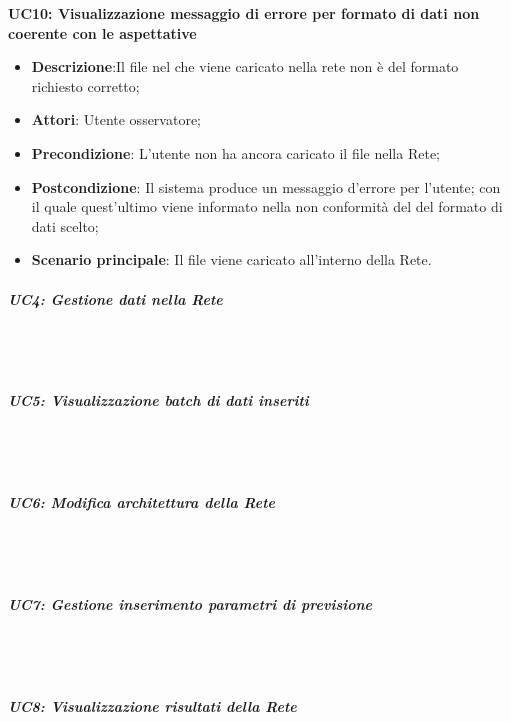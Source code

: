 \textbf{UC10: Visualizzazione messaggio di errore per formato di dati non coerente con le aspettative}\mbox{}
\label{UC10: Visualizzazione messaggio di errore per formato di dati non coerente con le aspettative}
\begin{itemize}
\item \textbf{Descrizione}:Il file nel che viene caricato nella rete non \`e del formato richiesto corretto;
\item \textbf{Attori}: Utente osservatore;
\item \textbf{Precondizione}: L'utente non ha ancora caricato il file nella Rete;
\item \textbf{Postcondizione}: Il sistema produce un messaggio d'errore per l'utente; con il quale quest'ultimo viene informato nella non conformit\`a del del formato di dati scelto;
\item \textbf{Scenario principale}: Il file viene caricato all'interno della Rete.
\end{itemize}

\subparagraph{UC4: Gestione dati nella Rete}\mbox{}\\\\
\label{UC4: Gestione dati nella Rete}
\noindent
\subparagraph{UC5: Visualizzazione batch di dati inseriti}\mbox{}\\\\
\label{UC5: Visualizzazione batch di dati inseriti}
\noindent
\subparagraph{UC6: Modifica architettura della Rete}\mbox{}\\\\
\label{UC6: Modifica architettura della Rete}
\noindent
\subparagraph{UC7: Gestione inserimento parametri di previsione}\mbox{}\\\\
\label{UC7: Gestione inserimento parametri di previsione}
\noindent
\subparagraph{UC8: Visualizzazione risultati della Rete}\mbox{}\\\\
\label{UC8: Visualizzazione risultati della Rete}
\noindent

